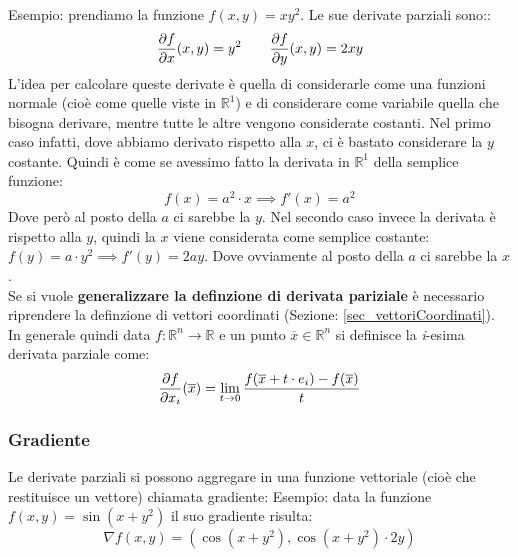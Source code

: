 Esempio: prendiamo la funzione $f(x, y) = xy^2$. Le sue derivate parziali sono::
\begin{equation*}
	\pdv{f}{x}() (x, y) = y^2 \qquad \pdv{f}{y}() (x, y) = 2xy
\end{equation*}
L'idea per calcolare queste derivate è quella di considerarle come una funzioni normale (cioè come quelle viste in $\mathbb{R}^1$) e di considerare come variabile quella che bisogna derivare, mentre tutte le altre vengono considerate costanti. Nel primo caso infatti, dove abbiamo derivato rispetto alla $x$, ci è bastato considerare la $y$ costante. Quindi è come se avessimo fatto la derivata in $\mathbb{R}^1$ della semplice funzione:
\begin{equation*}
	f(x) = a^2 \cdot x \implies f'(x) = a^2
\end{equation*}
Dove però al posto della $a$ ci sarebbe la $y$. Nel secondo caso invece la derivata è rispetto alla $y$, quindi la $x$ viene considerata come semplice costante: $f(y) = a \cdot y^2 \implies f'(y) = 2ay$. Dove ovviamente al posto della $a$ ci sarebbe la $x$.\\

Se si vuole \textbf{generalizzare la definzione di derivata pariziale} è necessario riprendere la definzione di vettori coordinati (Sezione: \ref{sec_vettoriCoordinati}). In generale quindi data $f: \mathbb{R}^n \to \mathbb{R}$ e un punto $\overline{x} \in \mathbb{R}^n$ si definisce la \textit{i}-esima derivata parziale come:
\begin{equation*}
	\pdv{f}{x_i}()(\overline{x}) = \lim_{t \to 0} \dfrac{f(\overline{x} + t \cdot e_i) - f(\overline{x})}{t}
\end{equation*}

\subsubsection{Gradiente}
Le derivate parziali si possono aggregare in una funzione vettoriale (cioè che restituisce un vettore) chiamata gradiente:
Esempio: data la funzione $f(x, y) = \sin(x + y^2)$ il suo gradiente risulta:
\begin{equation*}
	\nabla f (x, y) = (\cos(x + y^2), \cos(x + y^2) \cdot 2y)
\end{equation*}

